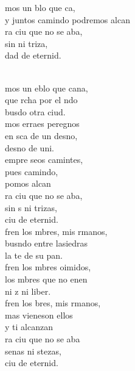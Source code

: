 \begin{cancion}%
	\begin{chorus}%
	mos un blo que ca,\\
	y juntos camindo podremos alcan\\
	ra ciu que no se aba,\\
	sin  ni triza,\\
	dad de eternid.\\
	\end{chorus}%
	\jump\\
	mos un eblo que cana,\\
	que rcha por el ndo\\
	busdo otra ciud.\\
	mos erraes peregnos\\
	en sca de un desno,\\
	desno de uni.\\
	empre seos camintes,\\
	pues  camindo,\\
	pomos alcan\\
	ra ciu que no se aba,\\
	sin s ni trizas,\\
	ciu de eternid.\\
\jump
	fren los mbres, mis rmanos,\\
	busndo entre lasiedras\\
	la te de su pan.\\
	fren los mbres oimidos,\\
	los mbres que no enen\\
	ni z ni liber.\\
	fren los bres, mis rmanos,\\
	mas vieneson ellos\\
	y ti alcanzan\\
	ra ciu que no se aba\\
	senas ni stezas,\\
	ciu de eternid.\\
\end{cancion}%
